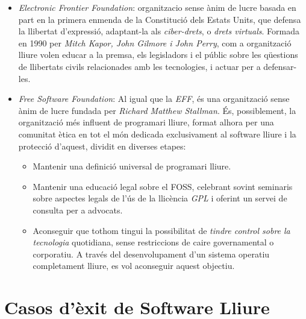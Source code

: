  \begin{itemize}
\item \emph{Electronic Frontier Foundation}:  organitzacio sense ànim de lucre basada en part en la primera enmenda de la Constitució dels Estats Units, que defensa la llibertat d'expressió, adaptant-la als \emph{ciber-drets}, o \emph{drets virtuals}. Formada en 1990 per \textit{Mitch Kapor, John Gilmore i John Perry}, com a organització lliure volen educar a la premsa, els legisladors i el públic sobre les qüestions de llibertats civils relacionades amb les tecnologies, i actuar per a defensar-les. \cite{OrgDefEFF}
 \cite{OrgDefEFFII}
\item \emph{Free Software Foundation}: Al igual que la \emph{EFF}, és una 		organització sense ànim de lucre fundada per \emph{Richard Matthew Stallman}. És, possiblement, la organització més 		influent de programari lliure, format alhora per una comunitat ètica en tot el món dedicada 		exclusivament al software lliure i la protecció d'aquest, dividit en diverses etapes:


	\begin{itemize}
	\item Mantenir una definició universal de programari lliure.
	\item Mantenir una educació legal sobre el FOSS, celebrant sovint seminaris sobre aspectes legals de l'ús de la 		llicència \emph{GPL} i oferint un servei de consulta per a advocats.
	\item Aconseguir que tothom tingui la possibilitat de \emph{tindre control sobre la tecnologia} 	quotidiana, sense restriccions de caire governamental o corporatiu. A través del desenvolupament d'un sistema operatiu completament lliure, es vol aconseguir aquest objectiu. \cite{ObjGNU} \cite{OrgDefFSF}
	\end{itemize}

\end{itemize}

\section{Casos d'èxit de Software Lliure}

